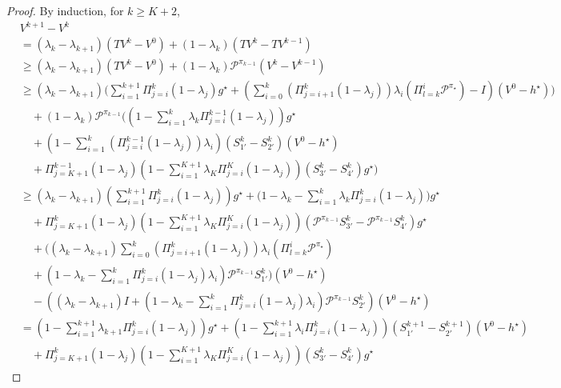 \documentclass{article} %
\newcommand{\cP}{\mathcal{P}}
\newcommand*{\para}[1]{\left({#1}\right)}
\begin{document}
\begin{proof}
By induction, for $k\ge K+2$,
\begin{align*}
    &V^{k+1}-V^{k} 
    \\ &= (\lambda_{k}-\lambda_{k+1})(TV^{k} -V^{0})+(1-\lambda_{k})(TV^{k} -TV^{k-1})
     \\ & \ge (\lambda_{k}-\lambda_{k+1})(TV^{k} -V^{0})+(1-\lambda_{k})\cP^{\pi_{k-1}}(V^{k} -V^{k-1})
         \\ & \ge (\lambda_{k}-\lambda_{k+1}) \Bigg(\sum_{i=1}^{k+1} \Pi^{k}_{j=i} (1-\lambda_j)g^{\star}+\para{\sum_{i=0}^{k} (\Pi^k_{j=i+1} (1-\lambda_j)) \lambda_{i}\para{\Pi^{i}_{l=k}\cP^{\pi_{\star}}}-I}(V^0-h^{\star})\Bigg)
    \\& \quad + (1-\lambda_{k})\cP^{\pi_{k-1}}\Bigg(\para{1-\sum_{i=1}^{k} \lambda_k \Pi^{k-1}_{j=i} (1-\lambda_j)}g^{\star} 
    \\& \quad + \para{1-\sum_{i=1}^{k}  \para{\Pi^{k-1}_{j=i} (1-\lambda_j)}\lambda_i}(S^{k}_{1'} -S^{k}_{2'})(V^0-h^{\star})
    \\& \quad +\Pi^{k-1}_{j=K+1} (1-\lambda_j)\para{1-\sum_{i=1}^{K+1} \lambda_{K} \Pi^{K}_{j=i} (1-\lambda_j)}(S^{k}_{3'}-S^{k}_{4'})g^{\star}\Bigg)
    \\ & \ge (\lambda_{k}-\lambda_{k+1})\para{ \sum_{i=1}^{k+1} \Pi^{k}_{j=i} (1-\lambda_j)}g^{\star}+\Bigg(1-\lambda_k-\sum_{i=1}^{k} \lambda_{k}\Pi^{k}_{j=i} (1-\lambda_j)\Bigg)g^{\star}
    \\& \quad +\Pi^{k}_{j=K+1} (1-\lambda_j)\para{1-\sum_{i=1}^{K+1} \lambda_{K} \Pi^{K}_{j=i} (1-\lambda_j)}(\cP^{\pi_{k-1}}S^{k}_{3'}-\cP^{\pi_{k-1}}S^{k}_{4'})g^{\star}
             \\& \quad + \Bigg((\lambda_{k}-\lambda_{k+1})\sum_{i=0}^{k} (\Pi^k_{j=i+1} (1-\lambda_j)) \lambda_{i}\para{\Pi^{i}_{l=k}\cP^{\pi_{\star}}}
             \\& \quad +\para{1-\lambda_k-\sum_{i=1}^{k}  \Pi^{k}_{j=i} (1-\lambda_j)\lambda_i}\cP^{\pi_{k-1}}S^k_{1'}\Bigg)(V^0-h^{\star})
    \\& \quad - \para{(\lambda_{k}-\lambda_{k+1})I+\para{1-\lambda_k-\sum_{i=1}^{k}  \Pi^{k}_{j=i} (1-\lambda_j)\lambda_i}\cP^{\pi_{k-1}}S^{k}_{2'}}(V^0-h^{\star})
    \\& = \para{1-\sum_{i=1}^{k+1} \lambda_{k+1} \Pi^{k}_{j=i} (1-\lambda_j)}g^{\star} + \para{1-\sum_{i=1}^{k+1} \lambda_i \Pi^{k}_{j=i} (1-\lambda_j)}(S^{k+1}_{1 '}-S^{k+1}_{2'})(V^0-h^{\star})
    \\& \quad +\Pi^{k}_{j=K+1} (1-\lambda_j)\para{1-\sum_{i=1}^{K+1} \lambda_{K} \Pi^{K}_{j=i} (1-\lambda_j)}(S^{k}_{3'}-S^{k}_{4'})g^{\star}

\end{align*}
\end{proof}
\end{document}
